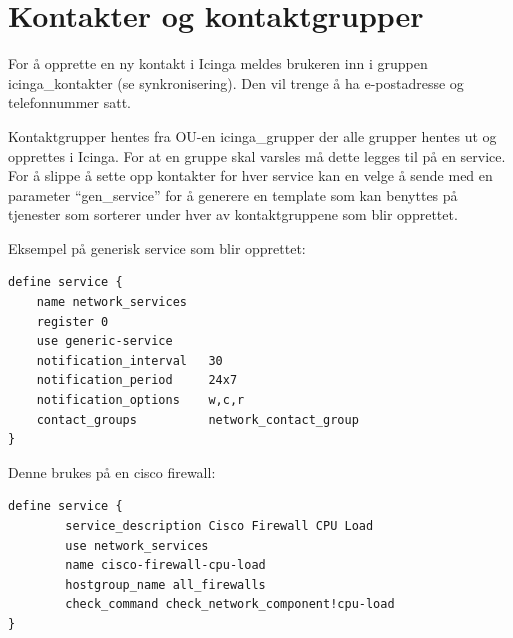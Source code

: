 \section{Kontakter og kontaktgrupper}

For å opprette en ny kontakt i Icinga meldes brukeren inn i gruppen icinga\_kontakter (se synkronisering). Den vil trenge å ha e-postadresse og telefonnummer satt.

Kontaktgrupper hentes fra OU-en icinga\_grupper der alle grupper hentes ut og opprettes i Icinga. For at en gruppe skal varsles må dette legges til på en service. For å slippe å sette opp kontakter for hver service kan en velge å sende med en parameter “gen\_service” for å generere en template som kan benyttes på tjenester som sorterer under hver av kontaktgruppene som blir opprettet.

Eksempel på generisk service som blir opprettet:

\begin{lstlisting}
define service {
    name network_services
    register 0
    use generic-service     
    notification_interval   30
    notification_period     24x7
    notification_options    w,c,r
    contact_groups          network_contact_group
}
\end{lstlisting}

Denne brukes på en cisco firewall: 

\begin{lstlisting}
define service {
        service_description Cisco Firewall CPU Load
        use network_services
        name cisco-firewall-cpu-load
        hostgroup_name all_firewalls
        check_command check_network_component!cpu-load
}
\end{lstlisting}
